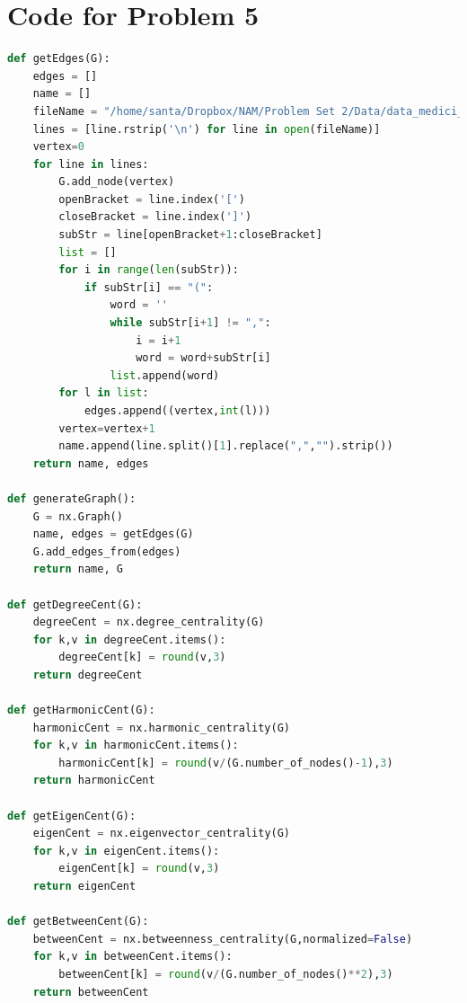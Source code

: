 \documentclass{article}
\begin{document}
\section*{Code for Problem 5}
\begin{lstlisting}[language=Python]
def getEdges(G):
    edges = []
    name = []
    fileName = "/home/santa/Dropbox/NAM/Problem Set 2/Data/data_medici_network.txt"
    lines = [line.rstrip('\n') for line in open(fileName)]
    vertex=0
    for line in lines:
        G.add_node(vertex)
        openBracket = line.index('[')
        closeBracket = line.index(']')
        subStr = line[openBracket+1:closeBracket]
        list = []
        for i in range(len(subStr)):
            if subStr[i] == "(":
                word = ''
                while subStr[i+1] != ",":
                    i = i+1
                    word = word+subStr[i]
                list.append(word)
        for l in list:
            edges.append((vertex,int(l)))
        vertex=vertex+1
        name.append(line.split()[1].replace(",","").strip())
    return name, edges

def generateGraph():
    G = nx.Graph()
    name, edges = getEdges(G)
    G.add_edges_from(edges)
    return name, G 

def getDegreeCent(G):
    degreeCent = nx.degree_centrality(G)
    for k,v in degreeCent.items():
        degreeCent[k] = round(v,3)
    return degreeCent

def getHarmonicCent(G):
    harmonicCent = nx.harmonic_centrality(G)
    for k,v in harmonicCent.items():
        harmonicCent[k] = round(v/(G.number_of_nodes()-1),3)
    return harmonicCent

def getEigenCent(G):
    eigenCent = nx.eigenvector_centrality(G)
    for k,v in eigenCent.items():
        eigenCent[k] = round(v,3)
    return eigenCent

def getBetweenCent(G):
    betweenCent = nx.betweenness_centrality(G,normalized=False)
    for k,v in betweenCent.items():
        betweenCent[k] = round(v/(G.number_of_nodes()**2),3)
    return betweenCent
\end{lstlisting} 
\newpage 
\end{document}
